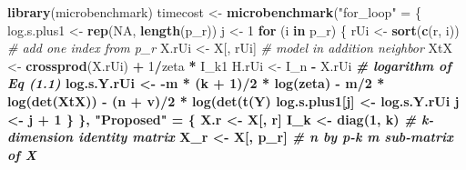\documentclass[
]{book}
\newenvironment{Shaded}{\begin{snugshade}}{\end{snugshade}}
\newcommand{\CommentTok}[1]{\textcolor[rgb]{0.56,0.35,0.01}{\textit{#1}}}
\newcommand{\ControlFlowTok}[1]{\textcolor[rgb]{0.13,0.29,0.53}{\textbf{#1}}}
\newcommand{\DecValTok}[1]{\textcolor[rgb]{0.00,0.00,0.81}{#1}}
\newcommand{\KeywordTok}[1]{\textcolor[rgb]{0.13,0.29,0.53}{\textbf{#1}}}
\newcommand{\NormalTok}[1]{#1}
\newcommand{\OperatorTok}[1]{\textcolor[rgb]{0.81,0.36,0.00}{\textbf{#1}}}
\newcommand{\OtherTok}[1]{\textcolor[rgb]{0.56,0.35,0.01}{#1}}
\newcommand{\StringTok}[1]{\textcolor[rgb]{0.31,0.60,0.02}{#1}}
\begin{document}
\begin{Shaded}
\begin{Highlighting}[]
\KeywordTok{library}\NormalTok{(microbenchmark)}
\NormalTok{timecost <-}\StringTok{ }\KeywordTok{microbenchmark}\NormalTok{(}\StringTok{"for_loop"}\NormalTok{ =}\StringTok{ }\NormalTok{\{}
\NormalTok{  log.s.plus1 <-}\StringTok{ }\KeywordTok{rep}\NormalTok{(}\OtherTok{NA}\NormalTok{, }\KeywordTok{length}\NormalTok{(p_r))}
\NormalTok{  j <-}\StringTok{ }\DecValTok{1}
  \ControlFlowTok{for}\NormalTok{ (i }\ControlFlowTok{in}\NormalTok{ p_r) \{}
\NormalTok{    rUi <-}\StringTok{ }\KeywordTok{sort}\NormalTok{(}\KeywordTok{c}\NormalTok{(r, i))  }\CommentTok{# add one index from p_r}
\NormalTok{    X.rUi <-}\StringTok{ }\NormalTok{X[, rUi]  }\CommentTok{# model in addition neighbor}
\NormalTok{    XtX <-}\StringTok{ }\KeywordTok{crossprod}\NormalTok{(X.rUi) }\OperatorTok{+}\StringTok{ }\DecValTok{1}\OperatorTok{/}\NormalTok{zeta }\OperatorTok{*}\StringTok{ }\NormalTok{I_k1}
\NormalTok{    H.rUi <-}\StringTok{ }\NormalTok{I_n }\OperatorTok{-}\StringTok{ }\NormalTok{X.rUi }\OperatorTok{%*%}\StringTok{ }\KeywordTok{solve}\NormalTok{(XtX) }\OperatorTok{%*%}\StringTok{ }\KeywordTok{t}\NormalTok{(X.rUi)}
    \CommentTok{# logarithm of Eq (1.1)}
\NormalTok{    log.s.Y.rUi <-}\StringTok{ }\OperatorTok{-}\NormalTok{m }\OperatorTok{*}\StringTok{ }\NormalTok{(k }\OperatorTok{+}\StringTok{ }\DecValTok{1}\NormalTok{)}\OperatorTok{/}\DecValTok{2} \OperatorTok{*}\StringTok{ }\KeywordTok{log}\NormalTok{(zeta) }\OperatorTok{-}\StringTok{ }
\StringTok{      }\NormalTok{m}\OperatorTok{/}\DecValTok{2} \OperatorTok{*}\StringTok{ }\KeywordTok{log}\NormalTok{(}\KeywordTok{det}\NormalTok{(XtX)) }\OperatorTok{-}\StringTok{ }\NormalTok{(n }\OperatorTok{+}\StringTok{ }\NormalTok{v)}\OperatorTok{/}\DecValTok{2} \OperatorTok{*}\StringTok{ }\KeywordTok{log}\NormalTok{(}\KeywordTok{det}\NormalTok{(}\KeywordTok{t}\NormalTok{(Y) }\OperatorTok{%*%}\StringTok{ }\NormalTok{H.rUi }\OperatorTok{%*%}\StringTok{ }\NormalTok{Y }\OperatorTok{+}\StringTok{ }\NormalTok{Psi))}
\NormalTok{    log.s.plus1[j] <-}\StringTok{ }\NormalTok{log.s.Y.rUi}
\NormalTok{    j <-}\StringTok{ }\NormalTok{j }\OperatorTok{+}\StringTok{ }\DecValTok{1}
\NormalTok{  \}}
\NormalTok{\},}
\StringTok{"Proposed"}\NormalTok{ =}\StringTok{ }\NormalTok{\{}
\NormalTok{  X.r <-}\StringTok{ }\NormalTok{X[, r]}
\NormalTok{  I_k <-}\StringTok{ }\KeywordTok{diag}\NormalTok{(}\DecValTok{1}\NormalTok{, k)  }\CommentTok{# k-dimension identity matrix }
\NormalTok{  X_r <-}\StringTok{ }\NormalTok{X[, p_r]  }\CommentTok{# n by p-k m sub-matrix of X}
}}
\end{Highlighting}
\end{Shaded}
\end{document}

